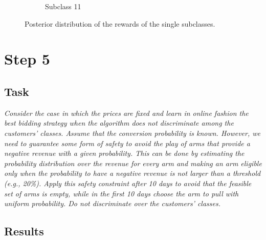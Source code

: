 \documentclass[12pt,a4paper]{report}
\begin{document}
\begin{figure}[H]
\begin{subfigure}{.49\textwidth}
  \caption{Subclass 11}
  \label{fig:sub4}
\end{subfigure}
	\caption{Posterior distribution of the rewards of the single subclasses.}
\end{figure}
		\section{Step 5}
			\subsection{Task}
\textit{Consider the case in which the prices are fixed and learn in online fashion the best bidding strategy when the algorithm does not discriminate among the customers’ classes. Assume that the conversion probability is known. However, we need to guarantee some form of safety to avoid the play of arms that provide a negative revenue with a given probability. This can be done by estimating the probability distribution over the revenue for every arm and making an arm eligible only when the probability to have a negative revenue is not larger than a threshold (e.g., 20\%). Apply this safety constraint after 10 days to avoid that the feasible set of arms is empty, while in the first 10 days choose the arm to pull with uniform probability. Do not discriminate over the customers’ classes.}
			\subsection{Results}
\end{document}
